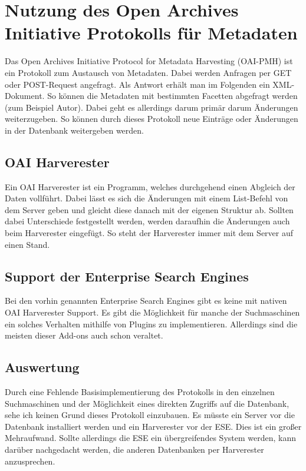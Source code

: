 \chapter{Nutzung des Open Archives Initiative Protokolls für Metadaten}

Das Open Archives Initiative Protocol for Metadata Harvesting (OAI-PMH) ist ein Protokoll zum Austausch von Metadaten. Dabei werden Anfragen per GET oder POST-Request angefragt. Als Antwort erhält man im Folgenden ein XML-Dokument. So können die Metadaten mit bestimmten Facetten abgefragt werden (zum Beispiel Autor). Dabei geht es allerdings darum primär darum Änderungen weiterzugeben. So können durch dieses Protokoll neue Einträge oder Änderungen in der Datenbank weitergeben werden.
\cite{DeutscheNationalBibliothek.2019}

\section{OAI Harverester}

Ein OAI Harverester ist ein Programm, welches durchgehend einen Abgleich der Daten vollführt. Dabei lässt es sich die Änderungen mit einem List-Befehl von dem Server geben und gleicht diese danach mit der eigenen Struktur ab. Sollten dabei Unterschiede festgestellt werden, werden daraufhin die Änderungen auch beim Harverester eingefügt. So steht der Harverester immer mit dem Server auf einen Stand.
\cite{DeutscheNationalBibliothek.2019}

\section{Support der Enterprise Search Engines}

Bei den vorhin genannten Enterprise Search Engines gibt es keine mit nativen OAI Harverester Support. Es gibt die Möglichkeit für manche der Suchmaschinen ein solches Verhalten mithilfe von Plugins zu implementieren. Allerdings sind die meisten dieser Add-ons auch schon veraltet.

\section{Auswertung}

Durch eine Fehlende Basisimplementierung des Protokolls in den einzelnen Suchmaschinen und der Möglichkeit eines direkten Zugriffs auf die Datenbank, sehe ich keinen Grund dieses Protokoll einzubauen. Es müsste ein Server vor die Datenbank installiert werden und ein Harverester vor der ESE. Dies ist ein großer Mehraufwand. Sollte allerdings die ESE ein übergreifendes System werden, kann darüber nachgedacht werden, die anderen Datenbanken per Harverester anzusprechen.